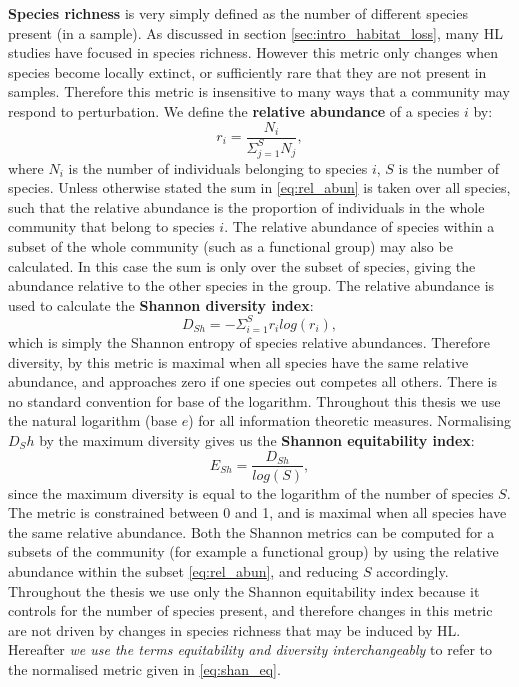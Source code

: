 \textbf{Species richness} is very simply defined as the number of different species present (in a sample). As discussed in section \ref{sec:intro_habitat_loss}, many HL studies have focused in species richness. However this metric only changes when species become locally extinct, or sufficiently rare that they are not present in samples. Therefore this metric is insensitive to many ways that a community may respond to perturbation. We define the \textbf{relative abundance} of a species $i$ by:
\begin{equation}
r_i = \frac{N_i}{\Sigma_{j=1}^S N_j},
\label{eq:rel_abun}
\end{equation}
%
where $N_i$ is the number of individuals belonging to species $i$, $S$ is the number of species. Unless otherwise stated the sum in \eqref{eq:rel_abun} is taken over all species, such that the relative abundance is the proportion of individuals in the whole community that belong to species $i$. The relative abundance of species within a subset of the whole community (such as a functional group) may also be calculated. In this case the sum is only over the subset of species, giving the abundance relative to the other species in the group. The relative abundance is used to calculate the \textbf{Shannon diversity index}:
\begin{equation}
D_{Sh} = -\Sigma_{i=1}^S r_i log( r_i),
\label{eq:shan_div}
\end{equation}
%
which is simply the Shannon entropy of species relative abundances. Therefore diversity, by this metric is maximal when all species have the same relative abundance, and approaches zero if one species out competes all others. There is no standard convention for base of the logarithm. Throughout this thesis we use the natural logarithm (base $e$) for all information theoretic measures. Normalising $D_Sh$ by the maximum diversity gives us the \textbf{Shannon equitability index}:
\begin{equation}
E_{Sh} = \frac{D_{Sh}}{log(S)},
\label{eq:shan_eq}
\end{equation}
%
since the maximum diversity is equal to the logarithm of the number of species $S$. The metric is constrained between 0 and 1, and is maximal when all species have the same relative abundance. Both the Shannon metrics can be computed for a subsets of the community (for example a functional group) by using the relative abundance within the subset \eqref{eq:rel_abun}, and reducing $S$ accordingly. Throughout the thesis we use only the Shannon equitability index because it controls for the number of species present, and therefore changes in this metric are not driven by changes in species richness that may be induced by HL. Hereafter \emph{we use the terms equitability and diversity interchangeably} to refer to the normalised metric given in \eqref{eq:shan_eq}.  

